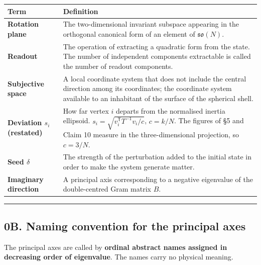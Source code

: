 \documentclass[
  10pt,
]{article}
\newcounter{none} %
\begin{document}
{\def\LTcaptype{none} %
\begin{longtable}[]{@{}
  >{\raggedright\arraybackslash}p{}
  >{\raggedright\arraybackslash}p{}@{}}
\toprule\noalign{}
\begin{minipage}[b]{\linewidth}\raggedright
Term
\end{minipage} & \begin{minipage}[b]{\linewidth}\raggedright
Definition
\end{minipage} \\
\midrule\noalign{}
\endhead
\bottomrule\noalign{}
\endlastfoot
\textbf{Rotation plane} & The two-dimensional invariant subspace
appearing in the orthogonal canonical form of an element of
\(\mathfrak{so}(N)\). \\
\textbf{Readout} & The operation of extracting a quadratic form from the
state. The number of independent components extractable is called the
number of readout components. \\
\textbf{Subjective space} & A local coordinate system that does not
include the central direction among its coordinates; the coordinate
system available to an inhabitant of the surface of the spherical
shell. \\
\textbf{Deviation \(s_i\) (restated)} & How far vertex \(i\) departs
from the normalised inertia ellipsoid.
\(s_i = \sqrt{v_i^{\mathsf T}T^{-1}v_i / c}\), \(c = k/N\). The figures
of §5 and Claim 10 measure in the three-dimensional projection, so
\(c = 3/N\). \\
\textbf{Seed \(\delta\)} & The strength of the perturbation added to the
initial state in order to make the system generate matter. \\
\textbf{Imaginary direction} & A principal axis corresponding to a
negative eigenvalue of the double-centred Gram matrix \(B\). \\
\end{longtable}
}

\begin{center}\rule{0.5\linewidth}{0.5pt}\end{center}

\subsection{0B. Naming convention for the principal
axes}\label{b.-naming-convention-for-the-principal-axes}

The principal axes are called by \textbf{ordinal abstract names assigned
in decreasing order of eigenvalue}. The names carry no physical meaning.
\end{document}
